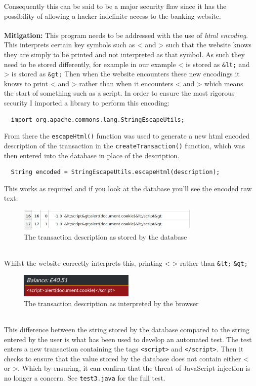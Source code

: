 Consequently this can be said to be a major security flaw since it has the possibility of allowing a hacker indefinite access to the banking website.\\ \\
\textbf{Mitigation:} This program needs to be addressed with the use of \textit{html encoding}. This interprets certain key symbols such as < and > such that the website knows
they are simply to be printed and not interpreted as that symbol. As such they need to be stored differently, for example in our example < is stored as \verb|&lt;| and > is stored as
\verb|&gt;| Then when the website encounters these new encodings it knows to print < and > rather than when it encounters < and > which means the start of something such as a
script. In order to ensure the most rigorous security I imported a library to perform this encoding:
\begin{verbatim}
  import org.apache.commons.lang.StringEscapeUtils;
\end{verbatim}
From there the \verb|escapeHtml()| function was used to generate a new html encoded description of the transaction in the \verb|createTransaction()| function, which was then
entered into the database in place of the description.
\begin{verbatim}
  String encoded = StringEscapeUtils.escapeHtml(description);
\end{verbatim}
This works as required and if you look at the database you'll see the encoded raw text:
\begin{figure}[h]
  \centering
  \includegraphics[width=0.8\textwidth]{figs/database.png}
  \caption{The transaction description as stored by the database}
  \label{fig2}
\end{figure}\\
Whilst the website correctly interprets this, printing < > rather than \verb|&lt;| \verb|&gt;|
\begin{figure}[h]
  \centering
  \includegraphics[width=0.5\textwidth]{figs/websitejs.png}
  \caption{The transaction description as interpreted by the browser}
  \label{fig3}
\end{figure}\\
This difference between the string stored by the database compared to the string entered by the user is what has been used to develop an automated test. The test enters a new
transaction containing the tags \verb|<script>| and \verb|</script>|. Then it checks to ensure that the value stored by the database does not contain either < or >. Which by
ensuring, it can confirm that the threat of JavaScript injection is no longer a concern. See \verb|test3.java| for the full test.